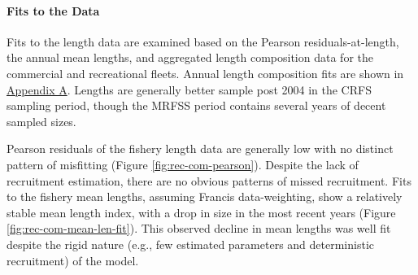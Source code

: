 \documentclass[11pt,
  english,
  a4paper,
]{article}
\begin{document}

\hypertarget{fits-to-the-data}{%
\paragraph{Fits to the Data}\label{fits-to-the-data}}

\leavevmode\tagmcend\tagstructend


Fits to the length data are examined based on the Pearson residuals-at-length, the annual mean lengths, and aggregated length composition data for the commercial and recreational fleets. Annual length composition fits are shown in {\protect\hyperlink{append_a}{Appendix A}\leavevmode\tagmcend\tagstructend}. Lengths are generally better sample post 2004 in the CRFS sampling period, though the MRFSS period contains several years of decent sampled sizes.

\leavevmode\tagmcend\tagstructend\par


Pearson residuals of the fishery length data are generally low with no distinct pattern of misfitting (Figure \ref{fig:rec-com-pearson}). Despite the lack of recruitment estimation, there are no obvious patterns of missed recruitment. Fits to the fishery mean lengths, assuming Francis data-weighting, show a relatively stable mean length index, with a drop in size in the most recent years (Figure \ref{fig:rec-com-mean-len-fit}). This observed decline in mean lengths was well fit despite the rigid nature (e.g., few estimated parameters and deterministic recruitment) of the model.

\leavevmode\tagmcend\tagstructend\par

\end{document}
